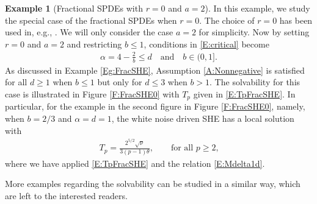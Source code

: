 \documentclass[a4paper,11pt]{article}
\numberwithin{equation}{section}
\numberwithin{equation}{section}
\theoremstyle{plain}
\theoremstyle{definition}
\newtheorem{example}[theorem]{Example}
\begin{document}
\begin{example}[Fractional SPDEs with $r=0$ and $a=2$] \label{Eg:FracSHE0}
  In this example, we study the special case of the fractional SPDEs when $r=0$. The choice of $r=0$
  has been used in, e.g., \cite{CHHH17}.  We will only consider the case $a=2$ for simplicity. Now
  by setting $r=0$ and $a=2$ and restricting $b\le 1$, conditions in \eqref{E:critical} become
  \begin{align} \label{E:CrFrSHE}
    \alpha =4- \frac{2}{b} \le d \quad  \text{and} \quad b\in (0,1].
  \end{align}
  As discussed in Example \ref{Eg:FracSHE}, Assumption \ref{A:Nonnegative} is satisfied for all
  $d\ge 1$ when $b\le 1$ but only for $d\le 3$ when $b>1$. The solvability for this case is
  illustrated in Figure \ref{F:FracSHE0} with $T_p$ given in \eqref{E:TpFracSHE}. In particular, for
  the example in the second figure in Figure \ref{F:FracSHE0}, namely, when $b=2/3$ and
  $\alpha=d=1$, the white noise driven SHE has a local solution with
  \begin{align}
    T_p= \frac{2^{5/2}\sqrt{\nu}}{3(p-1)\theta}, \qquad \text{for all $p\ge 2$,}
  \end{align}
  where we have applied \eqref{E:TpFracSHE} and the relation \eqref{E:Mdelta1d}.
\end{example}

More examples regarding the solvability can be studied in a similar way, which are left to the
interested readers.
\end{document}
